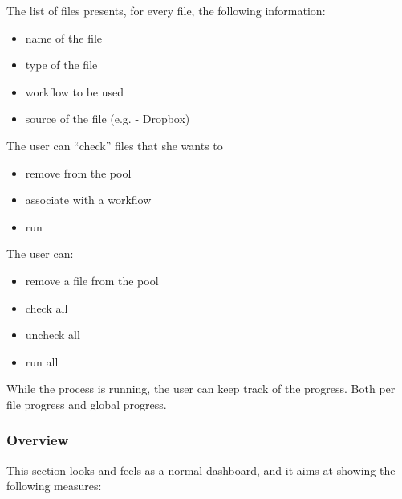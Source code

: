 \documentclass[12pt,oneside,svgnames]{memoir}
\begin{document}
The list of files presents, for every file, the following information:

\begin{itemize}
\itemsep1pt\parskip0pt
\item
  name of the file
\item
  type of the file
\item
  workflow to be used
\item
  source of the file (e.g. - Dropbox)
\end{itemize}

The user can ``check'' files that she wants to

\begin{itemize}
\itemsep1pt\parskip0pt
\item
  remove from the pool
\item
  associate with a workflow
\item
  run
\end{itemize}

The user can:

\begin{itemize}
\itemsep1pt\parskip0pt
\item
  remove a file from the pool
\item
  check all
\item
  uncheck all
\item
  run all
\end{itemize}

While the process is running, the user can keep track of the progress.
Both per file progress and global progress.

\subsubsection*{Overview}\label{overview}

This section looks and feels as a normal dashboard, and it aims at
showing the following measures:
\end{document}
